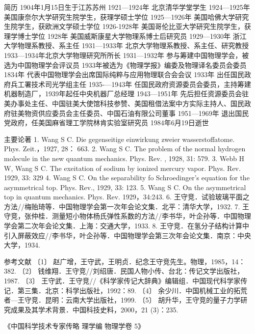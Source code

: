 简历
1904年1月15日生于江苏苏州
1921—1924年 北京清华学堂学生
1924—1925年 美国康奈尔大学研究生院学生，获理学硕士学位
1925—1926年 美国哈佛大学研究生院学生，获欧洲文学硕士学位
1926-1928年 美国哥伦比亚大学研究生院学生，获理学博士学位
1928年 美国威斯康星大学物理系博士后研究员
1929—1930年 浙江大学物理系教授、系主任
1931—1933年 北京大学物理系教授、系主任、研究教授
1933—1934年北京大学物理研究所所长
1931—1932年 参与筹建中国物理学会，被选为中国物理学会评议员
1933年被选为《物理学报》编委及物理译名委员会委员
1834年 代表中国物理学会出席国际纯粹与应用物理联合会会议
1933年 出任国民政府兵工署技术司光学组主任
1935-—1943年 任国民政府资源委员会委员，主持筹建机器制造厂，1939年起任中央机器厂总经理
1943—1951年 先后担任资源委员会驻美办事处主任、中国驻美大使馆科技参赞、美国租借法案中方实际主持人、国民政府驻美物资供应委员会主任委员、中国石油有限公司董事
1951—1969年 退出国民党政府，任美国麻省理工学院林肯实验室研究员
1984年6月19日逝世

主要论著
1. Wang S C. Die gegenseitige einwirkung zweier wasserstoffatome. Phys. Zeit.，1927, 28： 663.
2. Wang S C. The problem of the normal hydrogen molecule in the new quantum mechanics. Phys. Rev. , 1928, 31: 579.
3. Webb H W, Wang S C. The exeitation of sodium by ionized mercury vapor. Phys. Rev. 1929, 33: 329
4. Wang S C. On the separability fo Schroedinger's equation for the asymmetrical top. Phys. Rev., 1929, 33: 123.
5. Wang S C. On the asymmetrical top in quantum mechanics. Phys. Rev. 1929，34:243.
6. 王守竞．试验玻璃平面之方法//梅贻琦等．中国物理学会第一次年会论文集．北平：清华大学，1932.
7. 王守竞，张仲桂．测量短小物体杨氏弹性系数的方法//李书华，叶企孙等．中国物理学会第二次年会论文集．上海：交通大学，1933.
8. 王守竞．在氢分子结构计算中引入屏蔽效应//李书华，叶企孙等．中国物理学会第三次年会论文集．南京：中央大学，1934.

参考文献
〔1〕 赵广增，王守武，王明贞．纪念王守竞先生。物理，1985，14：382.
〔2〕 钱维翔．王守竞//刘绍唐．民国人物小传、台北：传记文学出版社，1987.
〔3〕 王守武．王守竞//《科学家传记大辞典》编辑组．中国现代科学家传记．第三集．北京：科学出版社，1992：89.
〔4〕 余少川．中国机械工业的拓荒者—王守竞．昆明：云南大学出版社，1999.
〔5〕 胡升华，王守竞的量子力学研究成果及其学术背景．中国科技史料，2000，21 (3)：235.

《中国科学技术专家传略 理学编 物理学卷 5》 
